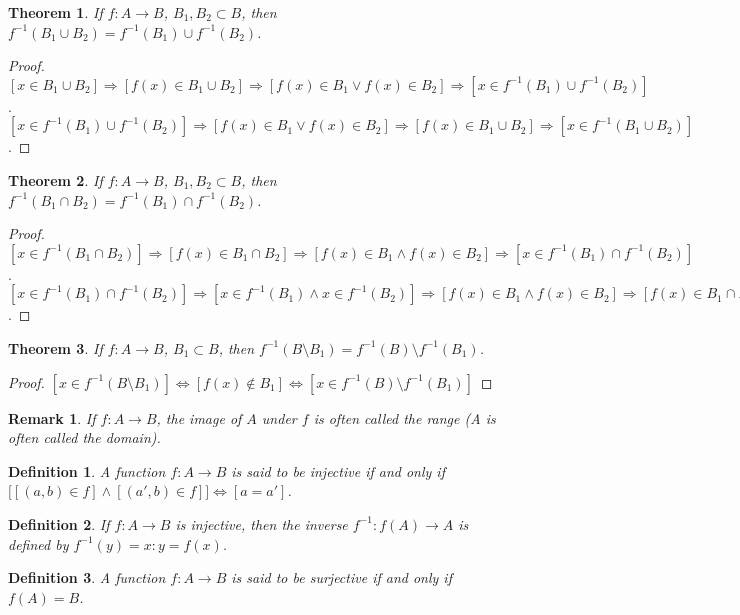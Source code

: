 \documentclass[crop=false,class=book]{standalone}
\theoremstyle{mystyle}
\newtheorem{theorem}{Theorem}[section]
\newtheorem{definition}{Definition}[section]
\newtheorem{remark}{Remark}[section]
\begin{document}
\begin{theorem}
If $f:A\rightarrow B$, $B_1,B_2\subset B$, then $f^{-1}(B_1\cup B_2) = f^{-1}(B_1)\cup f^{-1}(B_2)$.
\end{theorem}
\begin{proof}
$[x\in B_1\cup B_2]\Rightarrow [f(x)\in B_1\cup B_2]\Rightarrow [f(x)\in B_1\lor f(x)\in B_2]\Rightarrow [x\in f^{-1}(B_1)\cup f^{-1}(B_2)]$. $[x \in f^{-1}(B_1)\cup f^{-1}(B_2)]\Rightarrow [f(x)\in B_1\lor f(x) \in B_2]\Rightarrow [f(x) \in B_1\cup B_2]\Rightarrow [x\in f^{-1}(B_1\cup B_2)]$.
\end{proof}
\begin{theorem}
If $f:A\rightarrow B$, $B_1,B_2\subset B$, then $f^{-1}(B_1\cap B_2) = f^{-1}(B_1)\cap f^{-1}(B_2)$.
\end{theorem}
\begin{proof}
$[x\in f^{-1}(B_1\cap B_2)]\Rightarrow [f(x) \in B_1 \cap B_2]\Rightarrow [f(x)\in B_1\land f(x) \in B_2 ]\Rightarrow [x\in f^{-1}(B_1)\cap f^{-1}(B_2)]$. $[x\in f^{-1}(B_1)\cap f^{-1}(B_2)]\Rightarrow [x\in f^{-1}(B_1)\land x\in f^{-1}(B_2)]\Rightarrow [f(x) \in B_1\land f(x) \in B_2]\Rightarrow [f(x)\in B_1\cap B_2]\Rightarrow [x\in f^{-1}(B_1\cap B_2)]$.
\end{proof}
\begin{theorem}
If $f:A\rightarrow B$, $B_1 \subset B$, then $f^{-1}(B\setminus B_1) = f^{-1}(B)\setminus f^{-1}(B_1)$.
\end{theorem}
\begin{proof}
$[x\in f^{-1}(B\setminus B_1)]\Leftrightarrow [f(x)\notin B_1]\Leftrightarrow [x\in f^{-1}(B)\setminus f^{-1}(B_1)]$
\end{proof}
\begin{remark}
If $f:A\rightarrow B$, the image of $A$ under $f$ is often called the range (A is often called the domain).
\end{remark}
\begin{definition}
A function $f:A\rightarrow B$ is said to be injective if and only if $\big[[(a,b)\in f]\land[(a',b)\in f]\big]\Leftrightarrow [a=a']$.
\end{definition}
\begin{definition}
If $f:A\rightarrow B$ is injective, then the inverse $f^{-1}:f(A)\rightarrow A$ is defined by $f^{-1}(y)=x:y=f(x)$.
\end{definition}
\begin{definition}
A function $f:A\rightarrow B$ is said to be surjective if and only if $f(A) = B$.
\end{definition}
\end{document}
